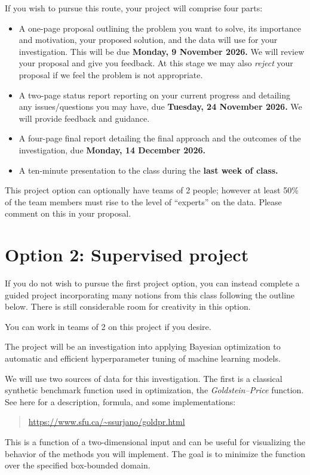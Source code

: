 \documentclass{article}
\begin{document}
If you wish to pursue this route, your project will comprise four parts:

\begin{itemize}
\item
  A one-page proposal outlining the problem you want to solve, its importance
  and motivation, your proposed solution, and the data will use for your
  investigation. This will be due \textbf{Monday, 9 November 2026.} We will
  review your proposal and give you feedback.  At this stage we may also
  \emph{reject} your proposal if we feel the problem is not appropriate.
\item
  A two-page status report reporting on your current progress and detailing any
  issues/questions you may have, due \textbf{Tuesday, 24 November 2026.}  We will
  provide feedback and guidance.
\item
  A four-page final report detailing the final approach and the outcomes of the
  investigation, due \textbf{Monday, 14 December 2026.}
\item
  A ten-minute presentation to the class during the \textbf{last week of class.}
\end{itemize}

This project option can optionally have teams of 2 people; however at least
50\% of the team members must rise to the level of ``experts'' on the
data. Please comment on this in your proposal.

\clearpage

\section*{Option 2: Supervised project}

If you do not wish to pursue the first project option, you can instead complete
a guided project incorporating many notions from this class following the
outline below. There is still considerable room for creativity in this option.

You can work in teams of 2 on this project if you desire.

The project will be an investigation into applying Bayesian optimization to
automatic and efficient hyperparameter tuning of machine learning models.

We will use two sources of data for this investigation. The first is a classical
synthetic benchmark function used in optimization, the \emph{Goldstein--Price}
function.  See here for a description, formula, and some implementations:
\begin{quote}
  \url{https://www.sfu.ca/~ssurjano/goldpr.html}
\end{quote}
This is a function of a two-dimensional input and can be useful for visualizing
the behavior of the methods you will implement. The goal is to minimize the
function over the specified box-bounded domain.
\end{document}
